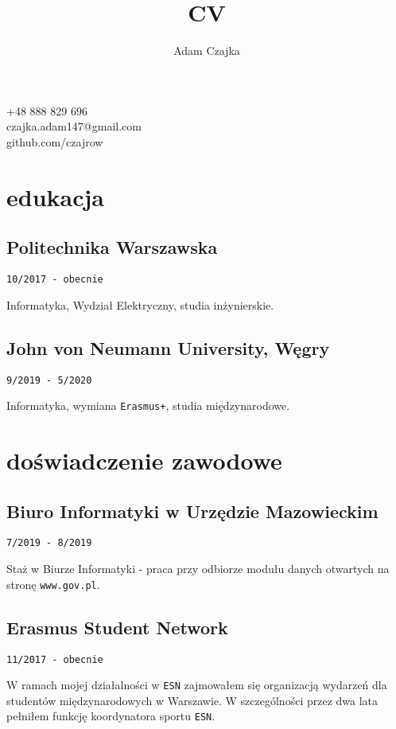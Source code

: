 \documentclass{article}
\makeatletter
\renewcommand{\maketitle}{
    \begin{center}



        {\huge\bfseries\theauthor}

        \vspace{.25em}

        +48 888 829 696\\czajka.adam147@gmail.com\\github.com/czajrow
	\end{center}
	\vspace{-.5cm}
}
\makeatother
\begin{document}
\title{CV}
\author{Adam Czajka}

\maketitle

\vspace{2em}

\begin{minipage}[t]{.5\textwidth}

	\section{edukacja}
	\subsection{Politechnika Warszawska}
	\texttt{10/2017 - obecnie}
	\par Informatyka, Wydział Elektryczny, studia inżynierskie.

	\subsection{John von Neumann University, Węgry}
	\texttt{9/2019 - 5/2020}
	\par Informatyka, wymiana \texttt{Erasmus+}, studia międzynarodowe.

	\vspace{2em}

	\section{doświadczenie zawodowe}

	\subsection{Biuro Informatyki w Urzędzie Mazowieckim}
	\texttt{7/2019 - 8/2019}
	\par Staż w Biurze Informatyki - praca przy odbiorze modułu danych otwartych na stronę \texttt{www.gov.pl}.

	\subsection{Erasmus Student Network}
	\texttt{11/2017 - obecnie}
	\par W ramach mojej działalności w \texttt{ESN} zajmowałem się organizacją wydarzeń dla studentów międzynarodowych w Warszawie. W szczególności przez dwa lata pełniłem funkcję koordynatora sportu \texttt{ESN}.


\end{minipage}
\end{document}
